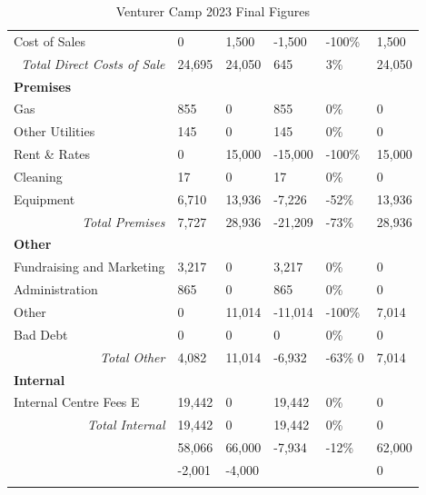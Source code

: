 {\begin{longtable}{p{} p{} p{} p{} p{} p{}}
    Cost of Sales & 0 & 1,500 & -1,500 & -100\% & 1,500 \\*
    \multicolumn{1}{r}{\textit{Total Direct Costs of Sale}} & 24,695 & 24,050 & 645 & 3\% & 24,050 \\
    \hline
    \multicolumn{6}{l}{\textbf{Premises}}\\*
    Gas & 855 & 0 & 855 & 0\% & 0 \\*
    Other Utilities & 145 & 0 & 145 & 0\% & 0 \\*
    Rent \& Rates & 0 & 15,000 & -15,000 & -100\% & 15,000 \\*
    Cleaning & 17 & 0 & 17 & 0\% & 0 \\*
    Equipment & 6,710 & 13,936 & -7,226 & -52\% & 13,936 \\*
    \multicolumn{1}{r}{\textit{Total Premises}} & 7,727 & 28,936 & -21,209 & -73\% & 28,936\\
    \hline
    \multicolumn{6}{l}{\textbf{Other}}\\*
    Fundraising and Marketing & 3,217 & 0 & 3,217 & 0\% & 0 \\*
    Administration & 865 & 0 & 865 & 0\% & 0 \\*
    Other & 0 & 11,014 & -11,014 & -100\% & 7,014 \\*
    Bad Debt & 0 & 0 & 0 & 0\% & 0 \\*
    \multicolumn{1}{r}{\textit{Total Other}} & 4,082 & 11,014 & -6,932 & -63\% 0 & 7,014 \\
    \hline
    \multicolumn{6}{l}{\textbf{Internal}}\\*
    Internal Centre Fees E & 19,442 & 0 & 19,442 & 0\% & 0 \\*
    \multicolumn{1}{r}{\textit{Total Internal}} & 19,442 & 0 & 19,442 & 0\% & 0 \\*
    \hline
    \rowcolor{accent!60}
    \multicolumn{1}{r}{\textit{Total Expenditure}} & 58,066 & 66,000 & -7,934 & -12\% & 62,000 \\
    \hline
    \hline
    \rowcolor{accent!60}
    \multicolumn{1}{r}{\textbf{Annual Surplus/(Deficit)}} & -2,001 & -4,000 &  &  & 0 \\
    \hline

    \caption{Venturer Camp 2023 Final Figures}
    \end{longtable}
} %